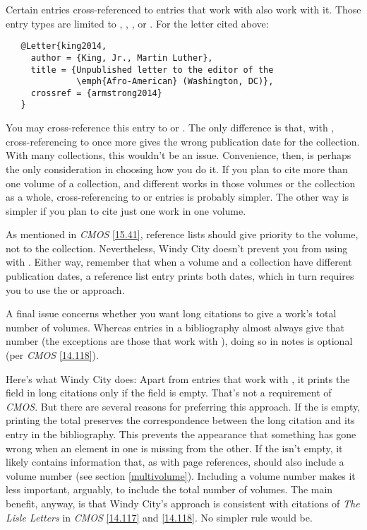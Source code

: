\documentclass[11pt,letterpaper,oneside]{article}
\begin{document}
Certain entries cross-referenced to entries that work with
 also work with it. Those entry types are limited to
, , , or
. For the letter cited above:

\begin{verbatim}
   @Letter{king2014,
     author = {King, Jr., Martin Luther},
     title = {Unpublished letter to the editor of the
              \emph{Afro-American} (Washington, DC)},
     crossref = {armstrong2014}
   }
\end{verbatim}

\noindent You may cross-reference this entry to
 or . The only difference
is that, with , cross-referencing to
 once more gives the wrong publication date for
the collection. With many collections, this wouldn't be an issue.
Convenience, then, is perhaps the only consideration in choosing how
you do it. If you plan to cite more than one volume of a collection,
and different works in those volumes or the collection as a whole,
cross-referencing to  or  entries
is probably simpler. The other way is simpler if you plan to cite just
one work in one volume.

As mentioned in \textit{CMOS} \ref{15.41}, reference lists should give
priority to the volume, not to the collection. Nevertheless, Windy
City doesn't prevent you from using  with .
Either way, remember that when a volume and a collection have
different publication dates, a reference list entry prints both dates,
which in turn requires you to use the  or
 approach.

\begin{refonly}
\nocite{armstrong2014}
\end{refonly}

A final issue concerns whether you want long citations to give a
work's total number of volumes. Whereas entries in a bibliography
almost always give that number (the exceptions are those that work
with ), doing so in notes is optional (per \textit{CMOS}
\ref{14.118}).

Here's what Windy City does: Apart from entries that work with
, it prints the  field in long
citations only if the  field is empty. That's not a
requirement of \textit{CMOS}. But there are several reasons for
preferring this approach. If the  is empty,
printing the total preserves the correspondence between the long
citation and its entry in the bibliography. This prevents the
appearance that something has gone wrong when an element in one is
missing from the other. If the  isn't empty, it
likely contains information that, as with page references, should also
include a volume number (see section \ref{multivolume}). Including a
volume number makes it less important, arguably, to include the total
number of volumes. The main benefit, anyway, is that Windy City's
approach is consistent with citations of \textit{The Lisle Letters} in
\textit{CMOS} \ref{14.117} and \ref{14.118}. No simpler rule would be.
\end{document}
